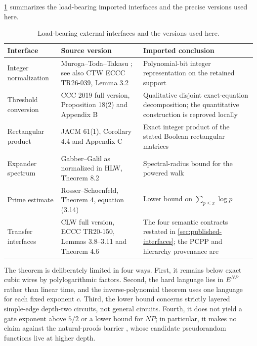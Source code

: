 \documentclass[11pt,letterpaper]{article}
\newcommand{\cref}[1]{\ref{#1}}
\let\Cref\cref
\theoremstyle{definition}
\theoremstyle{remark}
\begin{document}
\Cref{tab:source-contracts} summarizes the load-bearing imported
interfaces and the precise versions used here.

\begin{table}[ht]
\centering
\caption{Load-bearing external interfaces and the versions used here.}
\label{tab:source-contracts}
\small
\begin{tabularx}{\textwidth}{@{}
>{\raggedright\arraybackslash}p{}
@{\hspace{0.9em}}
>{\raggedright\arraybackslash}p{}
@{\hspace{0.9em}}
>{\raggedright\arraybackslash}X@{}}
\toprule
Interface & Source version & Imported conclusion \\
\midrule
Integer normalization & Muroga--Toda--Takasu \cite{MTT61}; see also
CTW ECCC TR26-039, Lemma 3.2 \cite{CTW26} & Polynomial-bit integer
representation on the retained support \\
Threshold conversion & CCC 2019 full version, Proposition 18(2) and
Appendix B \cite{CW19} & Qualitative disjoint exact-equation decomposition;
the quantitative construction is reproved locally \\
Rectangular product & JACM 61(1), Corollary 4.4 and Appendix C
\cite{WilACC14} & Exact integer product of the stated Boolean rectangular
matrices \\
Expander spectrum & Gabber--Galil \cite{GG81} as normalized in
HLW, Theorem 8.2 \cite{HLW06} & Spectral-radius bound for the powered walk \\
Prime estimate & Rosser--Schoenfeld, Theorem 4, equation (3.14)
\cite{RS62} & Lower bound on \(\sum_{p\le x}\log p\) \\
Transfer interfaces & CLW full version, ECCC TR20-150, Lemmas
3.8--3.11 and Theorem 4.6 \cite{CLW20} & The four semantic contracts restated
in \cref{sec:published-interfaces}; the PCPP and hierarchy provenance are
\cite{VW20,FS16} \\
\bottomrule
\end{tabularx}
\end{table}

The theorem is deliberately limited in four ways. First, it remains
below exact cubic wires by polylogarithmic factors. Second, the hard
language lies in \(E^{NP}\) rather than linear time, and the
inverse-polynomial theorem uses one language for each fixed exponent
\(c\). Third, the lower bound concerns strictly layered simple-edge
depth-two circuits, not general circuits. Fourth, it does not yield a
gate exponent above \(5/2\) or a lower bound for \(NP\); in
particular, it makes no claim against the natural-proofs barrier
\cite{RR97}, whose candidate pseudorandom functions live at higher
depth.
\end{document}
